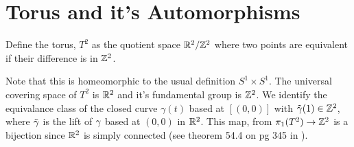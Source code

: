 \section{Torus and it's Automorphisms}
\begin{definition}
Define the torus, $T^2$ as the quotient space $\mathbb{R}^2/\mathbb{Z}^2$ where two points are equivalent if their difference is in $\mathbb{Z}^2$.
\end{definition}
Note that this is homeomorphic to the usual definition $S^1 \times S^1$. The universal covering space of $T^2$ is $\mathbb{R}^2$ and it's fundamental group is $\mathbb{Z}^2$. We identify the equivalance class of the closed curve $\gamma(t)$ based at $[(0,0)]$ with $\tilde{\gamma}(1)\in \mathbb{Z}^2$, where $\tilde{\gamma}$ is the lift of $\gamma$ based at $(0,0)$ in $\mathbb{R}^2$. This map, from $\pi_1(T^2) \to \mathbb{Z}^2$ is a bijection since $\mathbb{R}^2$ is simply connected (see theorem 54.4 on pg 345 in \cite{munkres}).\\

